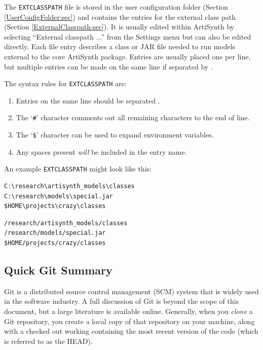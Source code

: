 The {\tt EXTCLASSPATH} file is stored in the user configuration folder
(Section \ref{UserConfigFolder:sec}) and contains the entries for the
external class path (Section \ref{ExternalClasspath:sec}).  It is
usually edited within ArtiSynth by selecting {\sf ``External classpath
...''} from the {\sf Settings} menu but can also be edited directly.
Each file entry describes a class \directory{} or JAR file needed to
run models external to the core ArtiSynth package.  Entries are
usually placed one per line, but multiple entries can be made on the
same line if separated by \separatorDesc{}.

The syntax rules for {\tt EXTCLASSPATH} are:

\begin{enumerate}

\item Entries on the same line should be separated
\separatorDesc{}.

\item The `{\tt \#}' character comments out all remaining characters
to the end of line.

\item The `{\tt \$}' character can be used to expand environment variables.

\item Any spaces present {\it will} be included in the entry name.

\end{enumerate}

An example {\tt EXTCLASSPATH} might look like this:

\ifWindows
\begin{verbatim}
C:\research\artisynth_models\classes
C:\research\models\special.jar
$HOME\projects\crazy\classes
\end{verbatim}
\else %
\begin{verbatim}
/research/artisynth_models/classes
/research/models/special.jar
$HOME/projects/crazy/classes
\end{verbatim}
\fi %

\subsection{Quick Git Summary}
\label{GitSummary}

Git is a distributed source control management (SCM) system that is
widely used in the software industry.  A full discussion of Git is
beyond the scope of this document, but a large literature is available
online. Generally, when you {\it clone} a Git repository, you create a
local copy of that repository on your machine, along with a checked
out working \directory{} containing the most recent version of the code
(which is referred to as the HEAD).

